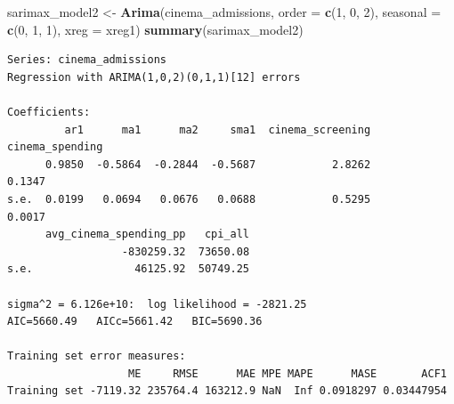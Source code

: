 \documentclass[
]{article}
\newenvironment{Shaded}{\begin{snugshade}}{\end{snugshade}}
\newcommand{\AttributeTok}[1]{\textcolor[rgb]{0.13,0.29,0.53}{#1}}
\newcommand{\ConstantTok}[1]{\textcolor[rgb]{0.56,0.35,0.01}{#1}}
\newcommand{\DecValTok}[1]{\textcolor[rgb]{0.00,0.00,0.81}{#1}}
\newcommand{\FunctionTok}[1]{\textcolor[rgb]{0.13,0.29,0.53}{\textbf{#1}}}
\newcommand{\NormalTok}[1]{#1}
\newcommand{\OtherTok}[1]{\textcolor[rgb]{0.56,0.35,0.01}{#1}}
\newcommand{\SpecialCharTok}[1]{\textcolor[rgb]{0.81,0.36,0.00}{\textbf{#1}}}
\newcommand{\StringTok}[1]{\textcolor[rgb]{0.31,0.60,0.02}{#1}}
\begin{document}
\begin{Shaded}
\end{Shaded}

\begin{Shaded}
\begin{Highlighting}[]
\NormalTok{sarimax\_model2 }\OtherTok{\textless{}{-}} \FunctionTok{Arima}\NormalTok{(cinema\_admissions, }\AttributeTok{order =} \FunctionTok{c}\NormalTok{(}\DecValTok{1}\NormalTok{, }\DecValTok{0}\NormalTok{, }\DecValTok{2}\NormalTok{), }\AttributeTok{seasonal =} \FunctionTok{c}\NormalTok{(}\DecValTok{0}\NormalTok{,}
    \DecValTok{1}\NormalTok{, }\DecValTok{1}\NormalTok{), }\AttributeTok{xreg =}\NormalTok{ xreg1)}
\FunctionTok{summary}\NormalTok{(sarimax\_model2)}
\end{Highlighting}
\end{Shaded}

\begin{verbatim}
Series: cinema_admissions 
Regression with ARIMA(1,0,2)(0,1,1)[12] errors 

Coefficients:
         ar1      ma1      ma2     sma1  cinema_screening  cinema_spending
      0.9850  -0.5864  -0.2844  -0.5687            2.8262           0.1347
s.e.  0.0199   0.0694   0.0676   0.0688            0.5295           0.0017
      avg_cinema_spending_pp   cpi_all
                  -830259.32  73650.08
s.e.                46125.92  50749.25

sigma^2 = 6.126e+10:  log likelihood = -2821.25
AIC=5660.49   AICc=5661.42   BIC=5690.36

Training set error measures:
                   ME     RMSE      MAE MPE MAPE      MASE       ACF1
Training set -7119.32 235764.4 163212.9 NaN  Inf 0.0918297 0.03447954
\end{verbatim}
\end{document}

